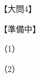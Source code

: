 \documentclass[../../../../hsm_tok_a.tex]{subfiles}
\begin{document}
    【大問4】

    【準備中】

    （1）


    （2）

\end{document}
